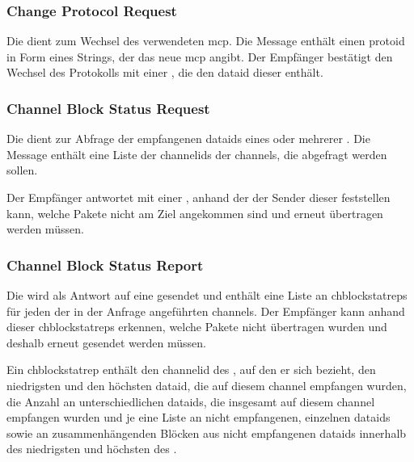 \bmcpackbytefield


\subsubsection*{Change Protocol Request}
\label{dcl-bmcp-chprotoreq}
Die \msg{\bmcpchprotoreq} dient zum Wechsel des verwendeten \gls{mcp}.
Die Message enthält einen \gls{protoid} in Form eines Strings, der das neue
\gls{mcp} angibt.
Der Empfänger bestätigt den Wechsel des Protokolls mit einer \msg{\bmcpack},
die den \gls{dataid} dieser \msg{\bmcpchprotoreq} enthält.

\bmcpchprotoreqbytefield


\subsubsection*{Channel Block Status Request}
\label{dcl-bmcp-chblockstatreq}
Die \msg{\bmcpchblockstatreq} dient zur Abfrage der empfangenen \glspl{dataid}
eines oder mehrerer .
Die Message enthält eine Liste der \glspl{channelid} der \glspl{channel}, die
abgefragt werden sollen.

Der Empfänger antwortet mit einer \msg{\bmcpchblockstatrep}, anhand der der
Sender dieser \msg{\bmcpchblockstatreq} feststellen kann, welche Pakete nicht
am Ziel angekommen sind und erneut übertragen werden müssen.



\subsubsection*{Channel Block Status Report}
\label{dcl-bmcp-chblockstatrep}
Die \msg{\bmcpchblockstatrep} wird als Antwort auf eine
\msg{\bmcpchblockstatreq} gesendet und enthält eine Liste an
\glspl{chblockstatrep} für jeden der in der Anfrage angeführten \glspl{channel}.
Der Empfänger kann anhand dieser \glspl{chblockstatrep} erkennen, welche Pakete
nicht übertragen wurden und deshalb erneut gesendet werden müssen.

Ein \gls{chblockstatrep} enthält den \gls{channelid} des
, auf den er sich bezieht,
den niedrigsten und den höchsten \gls{dataid}, die auf diesem \gls{channel}
empfangen wurden, %
die Anzahl an unterschiedlichen \glspl{dataid}, die insgesamt auf diesem
\gls{channel} empfangen wurden
und je eine Liste an nicht empfangenen, einzelnen \glspl{dataid} sowie an
zusammenhängenden Blöcken aus nicht empfangenen \glspl{dataid} innerhalb des
niedrigsten und höchsten  des
.

